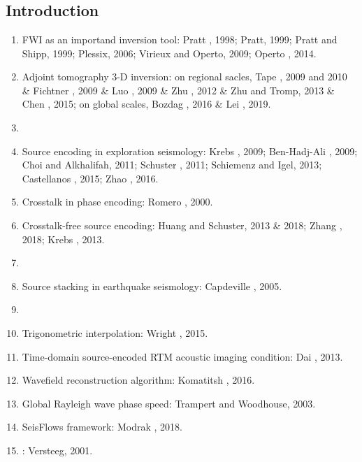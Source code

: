 \renewcommand{\pmk}{Tromp\_2019\_GJI\_Source encoding adjoint}
\renewcommand{\prf}{FWI/\pmk.pdf}
\renewcommand{\pti}{Source encoding for adjoint tomography}
\renewcommand{\pay}{Jeroen Tromp and Etienne Bachmann, 2019}
\renewcommand{\pjo}{Geophys. J. Int.}
\renewcommand{\pda}{2019/8/2 Fri.}

\section{\pinfo}
\subsection{Introduction}
\begin{enumerate}[\hspace{10mm*}]
  \item FWI as an importand inversion tool: Pratt \etal, 1998; Pratt, 1999;
    Pratt and Shipp, 1999; Plessix, 2006; Virieux and Operto, 2009;
    Operto \etal, 2014.
  \item Adjoint tomography 3-D inversion: on regional sacles, Tape \etal, 2009
    and 2010 \& Fichtner \etal, 2009 \& Luo \etal, 2009 \& Zhu \etal, 2012 \&
    Zhu and Tromp, 2013 \& Chen \etal, 2015;
    on global scales, Bozdag \etal, 2016 \& Lei \etal, 2019.
  \item \sline
  \item Source encoding in exploration seismology: Krebs \etal, 2009;
    Ben-Hadj-Ali \etal, 2009; Choi and Alkhalifah, 2011; Schuster \etal, 2011;
    Schiemenz and Igel, 2013; Castellanos \etal, 2015; Zhao \etal, 2016.
  \item Crosstalk in phase encoding: Romero \etal, 2000.
  \item Crosstalk-free source encoding: Huang and Schuster, 2013 \& 2018;
    Zhang \etal, 2018; Krebs \etal, 2013.
  \item \sline
  \item Source stacking in earthquake seismology: Capdeville \etal, 2005.
  \item \sline
  \item Trigonometric interpolation: Wright \etal, 2015.
  \item Time-domain source-encoded RTM acoustic imaging condition:
    Dai \etal, 2013.
  \item Wavefield reconstruction algorithm: Komatitsh \etal, 2016.
  \item Global Rayleigh wave phase speed: Trampert and Woodhouse, 2003.
  \item SeisFlows framework: Modrak \etal, 2018.
  \item {}
    :
    Versteeg, 2001.
\end{enumerate}

